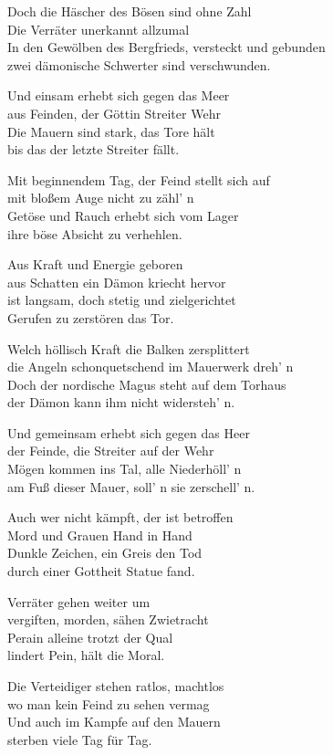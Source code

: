 Doch die Häscher des Bösen sind ohne Zahl\\
Die Verräter unerkannt allzumal\\
In den Gewölben des Bergfrieds, versteckt und gebunden\\
zwei dämonische Schwerter sind verschwunden.

Und einsam erhebt sich gegen das Meer\\
aus Feinden, der Göttin Streiter Wehr\\
Die Mauern sind stark, das Tore hält\\
bis das der letzte Streiter fällt.

Mit beginnendem Tag, der Feind stellt sich auf\\
mit bloßem Auge nicht zu zähl' n\\
Getöse und Rauch erhebt sich vom Lager\\
ihre böse Absicht zu verhehlen.

Aus Kraft und Energie geboren\\
aus Schatten ein Dämon kriecht hervor\\
ist langsam, doch stetig und zielgerichtet\\
Gerufen zu zerstören das Tor.

Welch höllisch Kraft die Balken zersplittert\\
die Angeln schonquetschend im Mauerwerk dreh' n\\
Doch der nordische Magus steht auf dem Torhaus\\
der Dämon kann ihm nicht widersteh' n.

Und gemeinsam erhebt sich gegen das Heer\\
der Feinde, die Streiter auf der Wehr\\
Mögen kommen ins Tal, alle Niederhöll' n\\
am Fuß dieser Mauer, soll' n sie zerschell' n.

Auch wer nicht kämpft, der ist betroffen\\
Mord und Grauen Hand in Hand\\
Dunkle Zeichen, ein Greis den Tod\\
durch einer Gottheit Statue fand.

Verräter gehen weiter um\\
vergiften, morden, sähen Zwietracht\\
Perain alleine trotzt der Qual\\
lindert Pein, hält die Moral.

Die Verteidiger stehen ratlos, machtlos\\
wo man kein Feind zu sehen vermag\\
Und auch im Kampfe auf den Mauern\\
sterben viele Tag für Tag.

